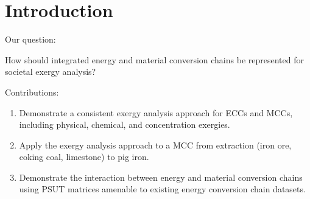 \documentclass[energies,article,submit,pdftex,moreauthors]{Definitions/mdpi}
\begin{document}
%


\section{Introduction}

Our question:

How should integrated energy and material conversion chains
be represented for societal exergy analysis?


Contributions:

%
\begin{enumerate}

  \item Demonstrate a consistent exergy analysis approach for ECCs and MCCs,
        including physical, chemical, and concentration exergies.

  \item Apply the exergy analysis approach to a MCC
        from extraction (iron ore, coking coal, limestone)
        to pig iron.

  \item Demonstrate the interaction
        between energy and material conversion chains
        using PSUT matrices
        amenable to existing energy conversion chain datasets.

\end{enumerate}
\end{document}
